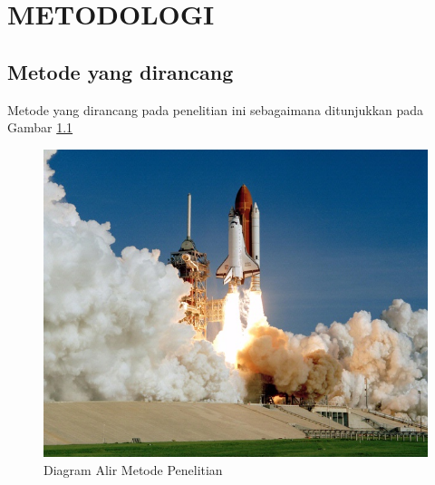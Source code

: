 \chapter{METODOLOGI}
\label{chap:metodologi}

\section{Metode yang dirancang}
\label{sec:metode yang dirancang}

Metode yang dirancang pada penelitian ini sebagaimana ditunjukkan pada Gambar \ref{fig:metode}

\begin{figure}[H]
  \centering
  \includegraphics[scale=0.35]{gambar/roketluarangkasa.jpg}

  \caption{Diagram Alir Metode Penelitian}
  \label{fig:metode}
\end{figure}

